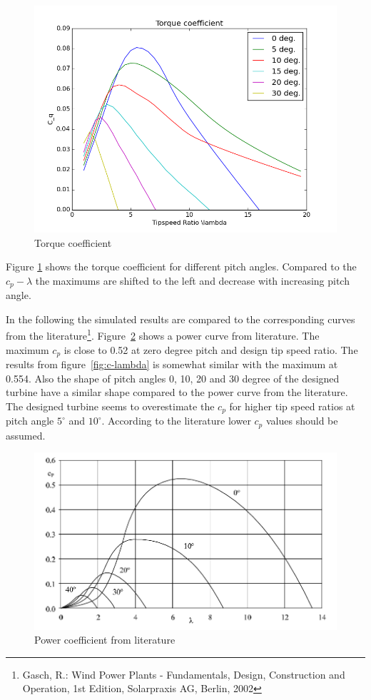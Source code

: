 \documentclass[10pt]{article}
\begin{document}
\begin{figure}[H]
\centering
\includegraphics[width=1\linewidth]{../CIP_3/WT_Perf/Output/torque.png}
\caption{Torque coefficient}
\label{fig:torque-coeff}
\end{figure} 
Figure \ref{fig:torque-coeff} shows the torque coefficient for different pitch angles. Compared to the $c_p-\lambda$ the maximums are shifted to the left and decrease with increasing pitch angle.  

In the following the simulated results are compared to the corresponding curves from the literature\footnote{Gasch, R.: Wind Power Plants - Fundamentals, Design, Construction and Operation, 1st Edition, Solarpraxis AG, Berlin, 2002}. Figure~\ref{fig:power-coeff-lit} shows a power curve from literature. The maximum $c_p$ is close to 0.52 at zero degree pitch and design tip speed ratio. The results from figure~\ref{fig:c-lambda} is somewhat similar with the maximum at 0.554. Also the shape of pitch angles 0, 10, 20 and 30 degree of the designed turbine have a similar shape compared to the power curve from the literature. The designed turbine seems to overestimate the $c_p$ for higher tip speed ratios at pitch angle $5^{\circ}$ and $10^{\circ}$. According to the literature lower $c_p$ values should be assumed.


\begin{figure}[H]
\centering
\includegraphics[width=1\linewidth]{../CIP_3/Report/power_coeff_literature.png}
\caption{Power coefficient from literature}
\label{fig:power-coeff-lit}
\end{figure} 
\end{document}
